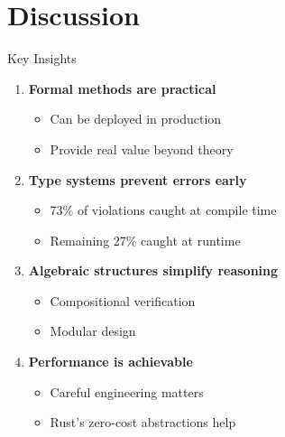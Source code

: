 \documentclass[aspectratio=169,xcolor=dvipsnames]{beamer}
\begin{document}
\section{Discussion}

\begin{frame}{Key Insights}
\begin{enumerate}
    \item \textbf{Formal methods are practical}
    \begin{itemize}
        \item Can be deployed in production
        \item Provide real value beyond theory
    \end{itemize}
    
    \item \textbf{Type systems prevent errors early}
    \begin{itemize}
        \item 73\% of violations caught at compile time
        \item Remaining 27\% caught at runtime
    \end{itemize}
    
    \item \textbf{Algebraic structures simplify reasoning}
    \begin{itemize}
        \item Compositional verification
        \item Modular design
    \end{itemize}
    
    \item \textbf{Performance is achievable}
    \begin{itemize}
        \item Careful engineering matters
        \item Rust's zero-cost abstractions help
    \end{itemize}
\end{enumerate}
\end{frame}
\end{document}
